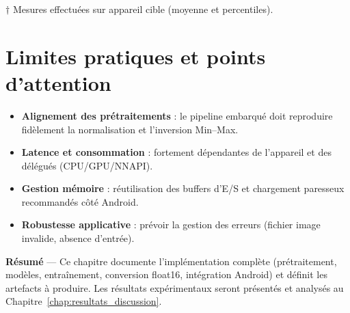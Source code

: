 \footnotesize{$\dagger$ Mesures effectuées sur appareil cible (moyenne et percentiles).}

\section{Limites pratiques et points d’attention}
\label{sec:limites}
\begin{itemize}
	\item \textbf{Alignement des prétraitements} : le pipeline embarqué doit reproduire fidèlement la normalisation et l’inversion Min--Max.
	\item \textbf{Latence et consommation} : fortement dépendantes de l’appareil et des délégués (CPU/GPU/NNAPI).
	\item \textbf{Gestion mémoire} : réutilisation des buffers d’E/S et chargement paresseux recommandés côté Android.
	\item \textbf{Robustesse applicative} : prévoir la gestion des erreurs (fichier image invalide, absence d’entrée).
\end{itemize}

\bigskip
\noindent \textbf{Résumé} — Ce chapitre documente l’implémentation complète (prétraitement, modèles, entraînement, conversion float16, intégration Android) et définit les artefacts à produire. Les résultats expérimentaux seront présentés et analysés au Chapitre~\ref{chap:resultats_discussion}.
